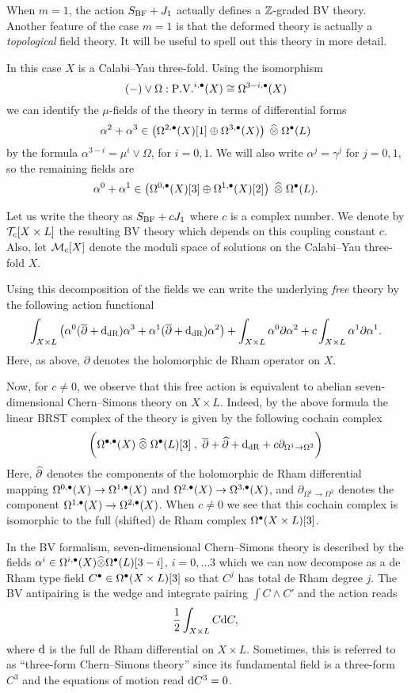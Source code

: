 \documentclass[11pt]{amsart}
\begin{document}
When $m=1$, the action $S_{\rm BF} + J_1$ actually defines a $\ZZ$-graded BV theory.
Another feature of the case $m=1$ is that the deformed theory is actually a {\em topological} field theory.
It will be useful to spell out this theory in more detail.

In this case $X$ is a Calabi--Yau three-fold.
Using the isomorphism
\[
 (-) \vee \Omega : \PV^{i,\bu} (X) \cong \Omega^{3-i, \bu}(X)
\]
we can identify the $\mu$-fields of the theory in terms of differential forms
\[
  \alpha^2 + \alpha^3 \in \left(\Omega^{2,\bu}(X)[1] \oplus \Omega^{3,\bu}(X)\right) \; \Hat{\otimes} \; \Omega^\bu(L)
\]
by the formula $\alpha^{3-i} = \mu^{i} \vee \Omega$, for $i=0,1$.
We will also write $\alpha^{j} = \gamma^{j}$ for $j=0,1$, so the remaining fields are
\[
  \alpha^0 + \alpha^1 \in \left(\Omega^{0,\bu}(X)[3] \oplus \Omega^{1,\bu}(X)[2] \right) \; \Hat{\otimes} \; \Omega^\bu(L).
\]

Let us write the theory as $S_{\rm BF} + c J_1$ where $c$ is a complex number.
We denote by $\cT_c [X \times L]$ the resulting BV theory which depends on this coupling constant $c$.
Also, let $\cM_c[X]$ denote the moduli space of solutions on the Calabi--Yau three-fold $X$.

Using this decomposition of the fields we can write the underlying {\em free} theory by the following action functional
\[
  \int_{X\times L} \left(\alpha^0 (\dbar + \d_{\rm dR}) \alpha^3 + \alpha^1 (\dbar + \d_{\rm dR}) \alpha^2 \right) + \int_{X \times L} \alpha^0 \partial \alpha^2 + c \int_{X \times L} \alpha^1 \partial \alpha^1 .
\]
Here, as above, $\partial$ denotes the holomorphic de Rham operator on $X$.

Now, for $c \ne 0$, we observe that this free action is equivalent to abelian seven-dimensional Chern--Simons theory on $X \times L$.
Indeed, by the above formula the linear BRST complex of the theory is given by the following cochain complex
\[
  \bigg(\Omega^{\bu, \bu} (X) \; \Hat{\otimes} \; \Omega^{\bu}(L) [3] \; , \; \dbar + \Hat{\partial} + \d_{\rm dR} + c \partial_{\Omega^{1} \to \Omega^{2}} \bigg)
\]
Here, $\Hat{\partial}$ denotes the components of the holomorphic de Rham differential mapping $\Omega^{0,\bu}(X) \to \Omega^{1,\bu}(X)$ and $\Omega^{2,\bu}(X) \to \Omega^{3,\bu}(X)$, and $\partial_{\Omega^1 \to \Omega^2}$ denotes the component $\Omega^{1,\bu}(X) \to \Omega^{2,\bu}(X)$.
When $c \ne 0$ we see that this cochain complex is isomorphic to the full (shifted) de Rham complex $\Omega^\bu(X \times L)[3]$.

In the BV formalism, seven-dimensional Chern--Simons theory is described by the fields $\alpha^i \in \Omega^{i,\bu}(X) \Hat{\otimes} \Omega^\bu(L)[3-i]$, $i=0, \ldots 3$ which we can now decompose as a de Rham type field $C^\bu \in \Omega^\bu(X \times L)[3]$ so that $C^j$ has total de Rham degree $j$.
The BV antipairing is the wedge and integrate pairing $\int C \wedge C'$ and the action reads
\[
  \frac{1}{2} \int_{X \times L} C \d C,
\]
where $\d$ is the full de Rham differential on $X \times L$.
Sometimes, this is referred to as ``three-form Chern--Simons theory'' since its fundamental field is a three-form $C^3$ and the equations of motion read $\d C^3 = 0$.
\end{document}

